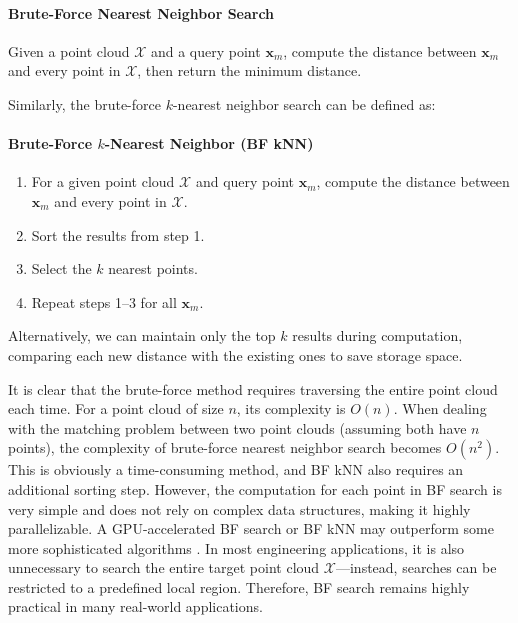 \begin{mdframed}
	\paragraph{Brute-Force Nearest Neighbor Search}  
	Given a point cloud $\mathcal{X}$ and a query point $\mathbf{x}_m$, compute the distance between $\mathbf{x}_m$ and every point in $\mathcal{X}$, then return the minimum distance.  
\end{mdframed}  

Similarly, the brute-force $k$-nearest neighbor search can be defined as:  

\begin{mdframed}
	\paragraph{Brute-Force $k$-Nearest Neighbor (BF kNN)}  
	\begin{enumerate}
		\item For a given point cloud $\mathcal{X}$ and query point $\mathbf{x}_m$, compute the distance between $\mathbf{x}_m$ and every point in $\mathcal{X}$.  
		\item Sort the results from step 1.  
		\item Select the $k$ nearest points.  
		\item Repeat steps 1–3 for all $\mathbf{x}_m$.  
	\end{enumerate}
\end{mdframed}  

Alternatively, we can maintain only the top $k$ results during computation, comparing each new distance with the existing ones to save storage space.  

It is clear that the brute-force method requires traversing the entire point cloud each time. For a point cloud of size $n$, its complexity is $O(n)$. When dealing with the matching problem between two point clouds (assuming both have $n$ points), the complexity of brute-force nearest neighbor search becomes $O(n^2)$. This is obviously a time-consuming method, and BF kNN also requires an additional sorting step. However, the computation for each point in BF search is very simple and does not rely on complex data structures, making it highly parallelizable. A GPU-accelerated BF search or BF kNN may outperform some more sophisticated algorithms \cite{Garcia2008, Li2015}. In most engineering applications, it is also unnecessary to search the entire target point cloud $\mathcal{X}$—instead, searches can be restricted to a predefined local region. Therefore, BF search remains highly practical in many real-world applications.  

